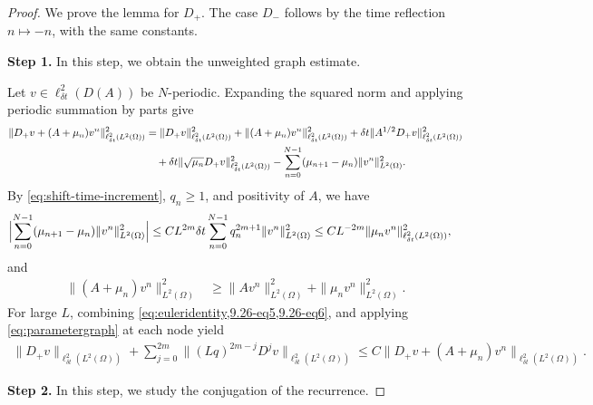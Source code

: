 \documentclass[print,wide,eng]{draft}
\begin{document}
\begin{proof}
We prove the lemma for $D_+$. The case $D_-$ follows by the time reflection $n\mapsto -n$, with the same constants.

{\bf Step 1.} In this step, we obtain the unweighted graph estimate.

Let $v\in\ell_{\delta t}^2(D(A))$ be $N$-periodic. Expanding the squared norm and applying periodic summation by parts give
%
\begin{align}\label{eq:euleridentity}
\|D_+v+(A+\mu_n)v^n\|_{\ell_{\delta t}^2(L^2(\Omega))}^2
&=\|D_+v\|_{\ell_{\delta t}^2(L^2(\Omega))}^2+\|(A+\mu_n)v^n\|_{\ell_{\delta t}^2(L^2(\Omega))}^2
+{\delta t}\|A^{1/2}D_+v\|_{\ell_{\delta t}^2(L^2(\Omega))}^2 \notag\\
&\quad + {\delta t}\|\sqrt{\mu_n}D_+v\|_{\ell_{\delta t}^2(L^2(\Omega))}^2
-\sum_{n=0}^{N-1}(\mu_{n+1}-\mu_n)\|v^n\|_{L^2(\Omega)}^2.
\end{align}
%
By \cref{eq:shift-time-increment}, $q_n\geq1$, and positivity of $A$, we have
%
\begin{align}\label{9.26-eq5}
\Bigl|\sum_{n=0}^{N-1}(\mu_{n+1}-\mu_n)\|v^n\|_{L^2(\Omega)}^2\Bigr|
&\leq CL^{2m}{\delta t}\sum_{n=0}^{N-1} q_n^{2m+1}\|v^n\|_{L^2(\Omega)}^2
\leq CL^{-2m}\|\mu_nv^n\|_{\ell_{\delta t}^2(L^2(\Omega))}^2,
\end{align}
%
and
%
\begin{align}\label{9.26-eq6}
\|(A+\mu_n)v^n\|_{L^2(\Omega)}^2
&\geq\|Av^n\|_{L^2(\Omega)}^2+\|\mu_nv^n\|_{L^2(\Omega)}^2.
\end{align}
%
For large $L$,  combining \cref{eq:euleridentity,9.26-eq5,9.26-eq6}, and applying \cref{eq:parametergraph} at each node yield
%
\begin{align}\label{eq:euler-unweighted-graph}
\|D_+v\|_{\ell_{\delta t}^2(L^2(\Omega))}+\sum_{j=0}^{2m}\|(Lq)^{2m-j}D^jv\|_{\ell_{\delta t}^2(L^2(\Omega))}
\leq C\|D_+v+(A+\mu_n)v^n\|_{\ell_{\delta t}^2(L^2(\Omega))}.
\end{align}
%

\medskip

{\bf Step 2.} In this step, we study the conjugation of the recurrence.


\end{proof}
\end{document}
